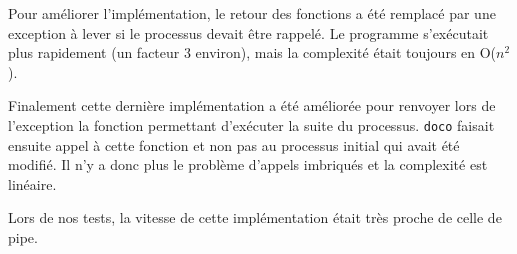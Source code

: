 \documentclass[a4paper]{article}
\begin{document}
Pour améliorer l'implémentation, le retour des fonctions a été remplacé par
une exception à lever si le processus devait être rappelé. Le programme
s'exécutait plus rapidement (un facteur 3 environ), mais la complexité était toujours en O($n^2$).

Finalement cette dernière implémentation a été améliorée pour renvoyer lors
de l'exception la fonction permettant d'exécuter la suite du
processus. \verb!doco! faisait ensuite appel à cette fonction et non pas au processus initial qui avait été modifié. Il n'y a donc plus le problème d'appels imbriqués et la complexité est linéaire.

Lors de nos tests, la vitesse de cette implémentation était très proche de celle de pipe.
\end{document}
